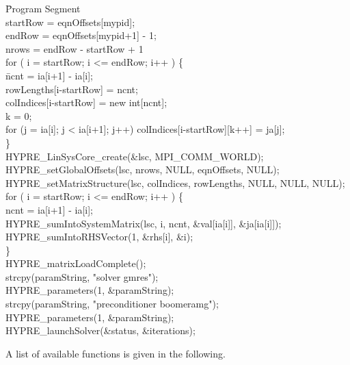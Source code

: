 \begin{tabbing}
\hspace{0.5in} \= {\sf Program Segment} \\[1mm]
\> {\sf startRow = eqnOffsets[mypid];} \\
\> {\sf endRow = eqnOffsets[mypid+1] - 1;} \\
\> {\sf nrows = endRow - startRow + 1} \\
\> {\sf for ( i = startRow; i <= endRow; i++ ) \{ } \\
\> \hspace{0.3in} \= {\sf ncnt = ia[i+1] - ia[i];} \\
\> \> {\sf rowLengths[i-startRow] = ncnt;} \\
\> \> {\sf colIndices[i-startRow] = new int[ncnt];} \\
\> \> {\sf k = 0;} \\
\> \> {\sf for (j = ia[i]; j < ia[i+1]; j++) colIndices[i-startRow][k++] = ja[j];}\\
\> \} \\
\> {\sf HYPRE\_LinSysCore\_create(\&lsc, MPI\_COMM\_WORLD);} \\
\> {\sf HYPRE\_setGlobalOffsets(lsc, nrows, NULL, eqnOffsets, NULL);} \\
\> {\sf HYPRE\_setMatrixStructure(lsc, colIndices, rowLengths, NULL, NULL, NULL);} \\
\> {\sf for ( i = startRow; i <= endRow; i++ ) \{ } \\
\> \> {\sf ncnt = ia[i+1] - ia[i];} \\
\> \> {\sf HYPRE\_sumIntoSystemMatrix(lsc, i, ncnt, \&val[ia[i]], \&ja[ia[i]]);}\\
\> \> {\sf HYPRE\_sumIntoRHSVector(1, \&rhs[i], \&i);} \\
\> \} \\
\> {\sf HYPRE\_matrixLoadComplete();}\\
\> {\sf strcpy(paramString, "solver gmres");} \\
\> {\sf HYPRE\_parameters(1, \&paramString);} \\
\> {\sf strcpy(paramString, "preconditioner boomeramg");} \\
\> {\sf HYPRE\_parameters(1, \&paramString);} \\
\> {\sf HYPRE\_launchSolver(\&status, \&iterations);}
\end{tabbing}

A list of available functions is given in the following.

